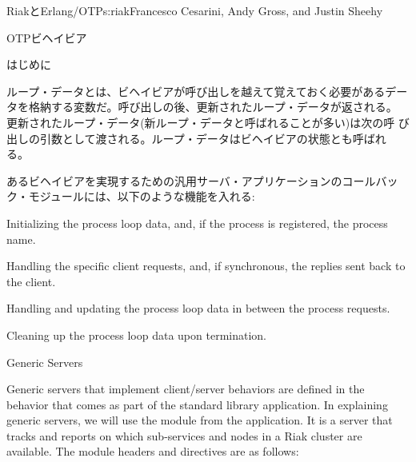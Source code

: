 \begin{aosachapter}{RiakとErlang/OTP}{s:riak}{Francesco Cesarini, Andy Gross, and Justin Sheehy}
\begin{aosasect1}{OTPビヘイビア}
\begin{aosasect2}{はじめに}
\begin{aosaitemize}
\end{aosaitemize}


ループ・データとは、ビヘイビアが呼び出しを越えて覚えておく必要があるデー
タを格納する変数だ。呼び出しの後、更新されたループ・データが返される。
更新されたループ・データ(新ループ・データと呼ばれることが多い)は次の呼
び出しの引数として渡される。ループ・データはビヘイビアの状態とも呼ばれ
る。


あるビヘイビアを実現するための汎用サーバ・アプリケーションのコールバック・モジュールには、以下のような機能を入れる:

\begin{aosaitemize}

  \item Initializing the process loop data, and, if the process is
  registered, the process name.

  \item Handling the specific client requests, and, if synchronous, the
  replies sent back to the client.

  \item Handling and updating the process loop data in between the
  process requests.

  \item Cleaning up the process loop data upon termination.

\end{aosaitemize}

\end{aosasect2}

\begin{aosasect2}{Generic Servers}

Generic servers that implement client/server behaviors are defined in
the  behavior that comes as part of the standard
library application. In explaining generic servers, we will use the
 module from the 
application. It is a server that tracks and reports on which
sub-services and nodes in a Riak cluster are available. The module
headers and directives are as follows:


\end{aosasect2}
\end{aosasect1}
\end{aosachapter}
